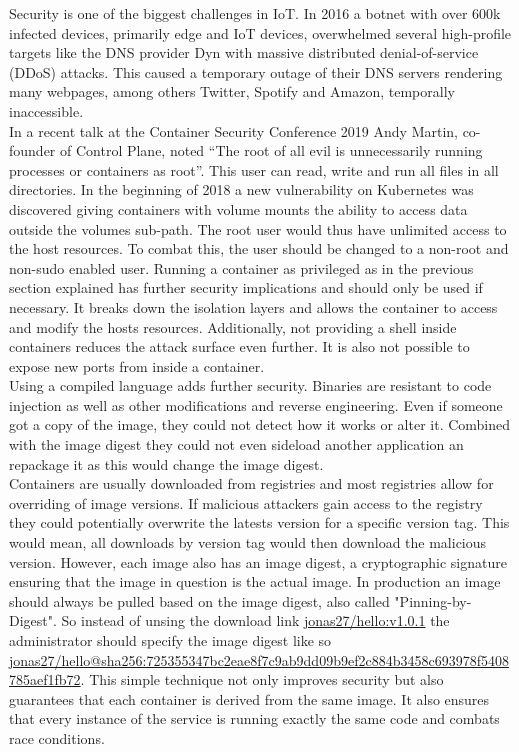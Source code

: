 Security is one of the biggest challenges in IoT. In 2016 a botnet with over 600k infected devices, primarily edge and IoT devices, overwhelmed several high-profile targets like the DNS provider Dyn with massive distributed denial-of-service (DDoS) attacks. This caused a temporary outage of their DNS servers rendering many webpages, among others  Twitter, Spotify and Amazon, temporally inaccessible. \\
In a recent talk at the Container Security Conference 2019 Andy Martin, co-founder of Control Plane, noted ``The root of all evil is unnecessarily running processes or containers as root''\cite{RootlessContainerSecurityTalk0:online}. This user can read, write and run all files in all directories. In the beginning of 2018 a new vulnerability on Kubernetes was discovered giving containers with volume mounts the ability to access data outside the volumes sub-path. The root user would thus have unlimited access to the host resources. To combat this, the user should be changed to a non-root and non-sudo enabled user. Running a container as privileged as in the previous section explained has further security implications and should only be used if necessary. It breaks down the isolation layers and allows the container to access and modify the hosts resources. Additionally, not providing a shell inside containers reduces the attack surface even further. It is also not possible to expose new ports from inside a container.\\
Using a compiled language adds further security. Binaries are resistant to code injection as well as other modifications and reverse engineering. Even if someone got a copy of the image, they could not detect how it works or alter it. Combined with the image digest they could not even sideload another application an repackage it as this would change the image digest. \\
Containers are usually downloaded from registries and most registries allow for overriding of image versions. If malicious attackers gain access to the registry they could potentially overwrite the latests version for a specific version tag. This would mean, all downloads by version tag would then download the malicious version. However, each image also has an image digest, a cryptographic signature ensuring that the image in question is the actual image. In production an image should always be pulled based on the image digest, also called "Pinning-by-Digest". So instead of unsing the download link \url{jonas27/hello:v1.0.1} the administrator should specify the image digest like so \url{jonas27/hello@sha256:725355347bc2eae8f7c9ab9dd09b9ef2c884b3458c693978f5408785aef1fb72}. This simple technique not only improves security but also guarantees that each container is derived from the same image. It also ensures that every instance of the service is running exactly the same code and combats race conditions.\\


